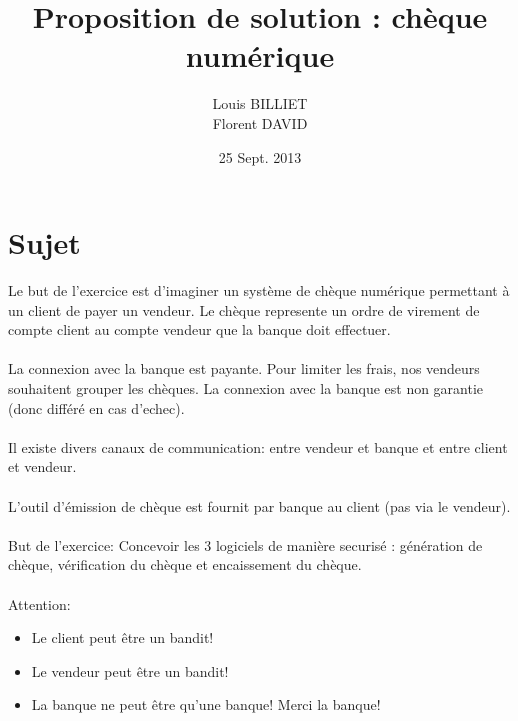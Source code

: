 \documentclass[oneside,10pt]{article}
\begin{document}
\title{Proposition de solution : ch\`eque num\'erique}
\author{Louis BILLIET \\ Florent DAVID}
\date{25 Sept. 2013}
\maketitle

\section{Sujet}
Le but de l'exercice est d'imaginer un syst\`eme de ch\`eque num\'erique permettant \`a un client de payer un vendeur.
Le ch\`eque represente un ordre de virement de compte client au compte vendeur que la banque doit effectuer.
\\
\\
La connexion avec la banque est payante. Pour limiter les frais, nos vendeurs souhaitent grouper les ch\`eques. 
La connexion avec la banque est non garantie (donc diff\'er\'e en cas d'echec).
\\
\\
Il existe divers canaux de communication: entre vendeur et banque et entre client et vendeur.
\\
\\
L'outil d'\'emission de ch\`eque est fournit par banque au client (pas via  le vendeur).
\\
\\
But de l'exercice: Concevoir les 3 logiciels de mani\`ere securis\'e : g\'en\'eration de ch\`eque, v\'erification du ch\`eque et encaissement du ch\`eque.
\\
\\
Attention:
\begin{itemize}
  \item Le client peut \^etre un bandit!
  \item Le vendeur peut \^etre un bandit!
  \item La banque ne peut \^etre qu'une banque! Merci la banque!
\end{itemize}
\end{document}
